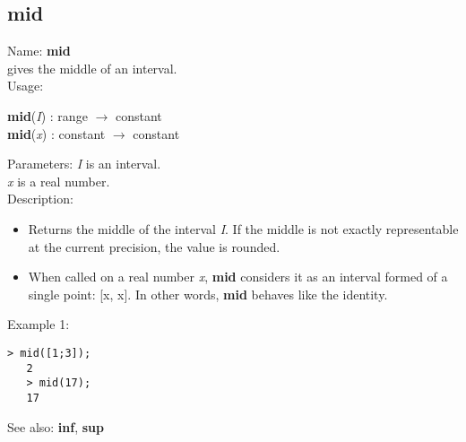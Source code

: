 \subsection{ mid }
\noindent Name: \textbf{mid}\\
gives the middle of an interval.\\

\noindent Usage: 
\begin{center}
\textbf{mid}(\emph{I}) : \textsf{range} $\rightarrow$ \textsf{constant}\\
\textbf{mid}(\emph{x}) : \textsf{constant} $\rightarrow$ \textsf{constant}\\
\end{center}
Parameters: 
\emph{I} is an interval.\\
\emph{x} is a real number.\\

\noindent Description: \begin{itemize}

\item Returns the middle of the interval \emph{I}. If the middle is not exactly 
   representable at the current precision, the value is rounded.

\item When called on a real number \emph{x}, \textbf{mid} considers it as an interval formed
   of a single point: [x, x]. In other words, \textbf{mid} behaves like the identity.
\end{itemize}
\noindent Example 1: 
\begin{center}\begin{minipage}{14.8cm}\begin{Verbatim}[frame=single]
   > mid([1;3]);
   2
   > mid(17);
   17
\end{Verbatim}
\end{minipage}\end{center}
See also: \textbf{inf}, \textbf{sup}
